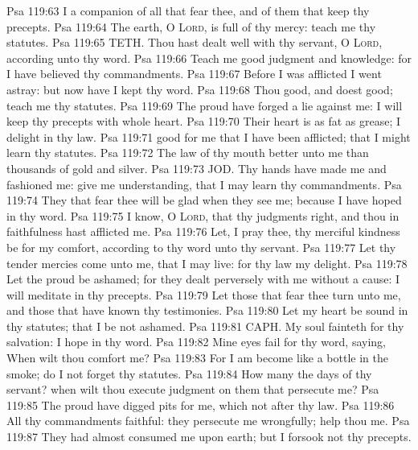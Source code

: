 \vs Psa 119:63 I  a companion of all  that fear thee, and of them that keep thy precepts.
\vs Psa 119:64 The earth, O \textsc{Lord}, is full of thy mercy: teach me thy statutes.
\vs Psa 119:65 TETH. Thou hast dealt well with thy servant, O \textsc{Lord}, according unto thy word.
\vs Psa 119:66 Teach me good judgment and knowledge: for I have believed thy commandments.
\vs Psa 119:67 Before I was afflicted I went astray: but now have I kept thy word.
\vs Psa 119:68 Thou  good, and doest good; teach me thy statutes.
\vs Psa 119:69 The proud have forged a lie against me:  I will keep thy precepts with  whole heart.
\vs Psa 119:70 Their heart is as fat as grease;  I delight in thy law.
\vs Psa 119:71  good for me that I have been afflicted; that I might learn thy statutes.
\vs Psa 119:72 The law of thy mouth  better unto me than thousands of gold and silver.
\vs Psa 119:73 JOD. Thy hands have made me and fashioned me: give me understanding, that I may learn thy commandments.
\vs Psa 119:74 They that fear thee will be glad when they see me; because I have hoped in thy word.
\vs Psa 119:75 I know, O \textsc{Lord}, that thy judgments  right, and  thou in faithfulness hast afflicted me.
\vs Psa 119:76 Let, I pray thee, thy merciful kindness be for my comfort, according to thy word unto thy servant.
\vs Psa 119:77 Let thy tender mercies come unto me, that I may live: for thy law  my delight.
\vs Psa 119:78 Let the proud be ashamed; for they dealt perversely with me without a cause:  I will meditate in thy precepts.
\vs Psa 119:79 Let those that fear thee turn unto me, and those that have known thy testimonies.
\vs Psa 119:80 Let my heart be sound in thy statutes; that I be not ashamed.
\vs Psa 119:81 CAPH. My soul fainteth for thy salvation:  I hope in thy word.
\vs Psa 119:82 Mine eyes fail for thy word, saying, When wilt thou comfort me?
\vs Psa 119:83 For I am become like a bottle in the smoke;  do I not forget thy statutes.
\vs Psa 119:84 How many  the days of thy servant? when wilt thou execute judgment on them that persecute me?
\vs Psa 119:85 The proud have digged pits for me, which  not after thy law.
\vs Psa 119:86 All thy commandments  faithful: they persecute me wrongfully; help thou me.
\vs Psa 119:87 They had almost consumed me upon earth; but I forsook not thy precepts.
